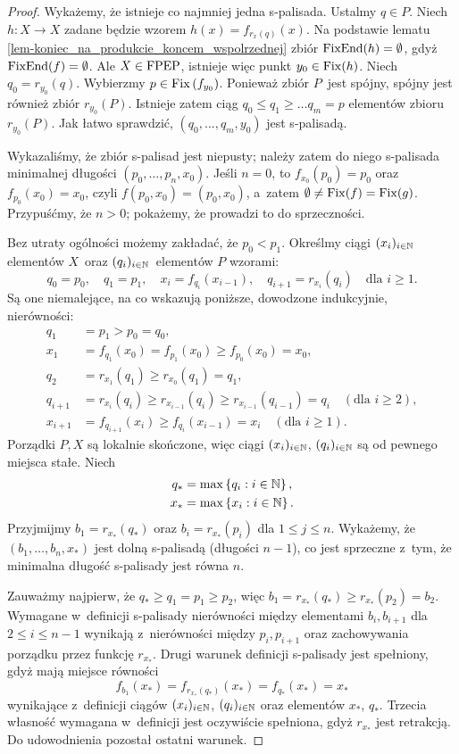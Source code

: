 \begin{proof}
Wykażemy, że istnieje co najmniej jedna s-palisada. Ustalmy $q\in P$. Niech $h\colon X\to X$ zadane będzie wzorem $h(x)=f_{r_x(q)}(x)$. Na podstawie lematu \ref{lem-koniec_na_produkcie_koncem_wspolrzednej} zbiór $\operatorname{FixEnd}(h)=\emptyset$, gdyż $\operatorname{FixEnd}(f)=\emptyset$. Ale $X\in\mathrm{FPEP}$, istnieje więc punkt $y_0\in\operatorname{Fix}(h)$. Niech $q_0=r_{y_0}(q)$. Wybierzmy $p\in\operatorname{Fix}\left(f_{y_0}\right)$. Ponieważ zbiór $P$~jest spójny, spójny jest również zbiór $r_{y_0}(P)$. Istnieje zatem ciąg $q_0\leq q_1\geq\ldots q_m=p$ elementów zbioru $r_{y_0}(P)$. Jak łatwo sprawdzić, $(q_0,\ldots,q_m,y_0)$ jest \mbox{s-palisadą}.

Wykazaliśmy, że zbiór \mbox{s-palisad} jest niepusty; należy zatem do niego \mbox{s-palisada} minimalnej długości $(p_0,\ldots,p_n,x_0)$. Jeśli $n=0$, to $f_{x_0}(p_0)=p_0$ oraz $f_{p_0}(x_0)=x_0$, czyli $f(p_0,x_0)=(p_0,x_0)$, a~zatem $\emptyset\not=\operatorname{Fix}(f)=\operatorname{Fix}(g)$. Przypuśćmy, że $n>0$; pokażemy, że prowadzi to do sprzeczności.

Bez utraty ogólności możemy zakładać, że $p_0<p_1$. Określmy ciągi $(x_i)_{i\in\mathbb{N}}$ elementów $X$~oraz $(q_i)_{i\in\mathbb{N}}$~elementów $P$ wzorami:
\[q_0=p_0,\quad q_1=p_1,\quad x_i=f_{q_i}(x_{i-1}),\quad q_{i+1}=r_{x_i}(q_i)\quad \text{dla } i\geq 1.\]
Są one niemalejące, na co wskazują poniższe, dowodzone indukcyjnie, nierówności:
\begin{align*}
q_1&=p_1>p_0=q_0,\\
x_1&=f_{q_1}(x_0)=f_{p_1}(x_0)\geq f_{p_0}(x_0)=x_0,\\
q_2&=r_{x_1}(q_1)\geq r_{x_0}(q_1)=q_1,\\
q_{i+1}&=r_{x_i}(q_i)\geq r_{x_{i-1}}(q_i)\geq r_{x_{i-1}}(q_{i-1})=q_i \quad(\text{dla } i\geq 2),\\
x_{i+1}&=f_{q_{i+1}}(x_i)\geq f_{q_i}(x_{i-1})=x_i \quad(\text{dla } i\geq 1).
\end{align*}
Porządki $P,X$ są lokalnie skończone, więc ciągi $(x_i)_{i\in\mathbb{N}}$, $(q_i)_{i\in\mathbb{N}}$ są od pewnego miejsca stałe. Niech \begin{align*}q_*&=\max\left\{q_i:i\in\mathbb{N}\right\},\\ x_*&=\max\left\{x_i:i\in\mathbb{N}\right\}.\end{align*} Przyjmijmy $b_1=r_{x_*}(q_*)$ oraz $b_i=r_{x_*}(p_i)$ dla $1\leq j\leq n$. Wykażemy, że $(b_1,\ldots,b_n,x_*)$ jest dolną \mbox{s-palisadą} (długości $n-1$), co jest sprzeczne z~tym, że minimalna długość \mbox{s-palisady} jest równa $n$. 

Zauważmy najpierw, że $q_*\geq q_1=p_1\geq p_2$, więc $b_1=r_{x_*}(q_*)\geq r_{x_*}(p_2)=b_2$. Wymagane w~definicji \mbox{s-palisady} nierówności między elementami $b_i,b_{i+1}$ dla $2\leq i\leq n-1$ wynikają z~nierówności między $p_i, p_{i+1}$ oraz zachowywania porządku przez funkcję $r_{x_*}$. Drugi warunek definicji \mbox{s-palisady} jest spełniony, gdyż mają miejsce równości \[f_{b_1}(x_*)=f_{r_{x_*}(q_*)}(x_*)=f_{q_*}(x_*)=x_*\] wynikające z~definicji ciągów $(x_i)_{i\in\mathbb{N}}$, $(q_i)_{i\in\mathbb{N}}$ oraz elementów $x_*$, $q_*$. Trzecia własność wymagana w~definicji jest oczywiście spełniona, gdyż $r_{x_*}$ jest retrakcją. Do udowodnienia pozostał ostatni warunek.


\end{proof}
